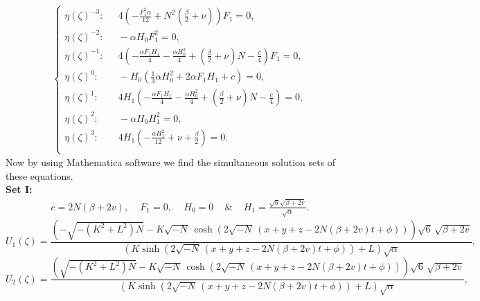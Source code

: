 \documentclass[10pt]{NSP1}
\numberwithin{equation}{section}
\begin{document}
\begin{align}
\begin{cases}
\eta{(\zeta)}^{-3} :\;\,\quad 4 \left(-\frac{F_{1}^{2} \alpha}{12}+N^{2} \left(\frac{\beta}{2}+\nu \right)\right) F_{1} = 0, \\
\eta{(\zeta)}^{-2} :\;\,\quad -\alpha  H_{0} F_{1}^{2} = 0,\\
\eta{(\zeta)}^{-1} :\,\;\quad 4 \left(-\frac{\alpha  F_{1} H_{1}}{4}-\frac{\alpha  H_{0}^{2}}{4}+\left(\frac{\beta}{2}+\nu \right) N -\frac{c}{4}\right) F_{1} = 0,\\
\eta{(\zeta)}^{0}  :\qquad -H_{0} \left(\frac{1}{3} \alpha  H_{0}^{2}+2 \alpha  F_{1} H_{1}+c \right) = 0,\\
\eta{(\zeta)}^{1}  :\qquad 4 H_{1} \left(-\frac{\alpha  F_{1} H_{1}}{4}-\frac{\alpha  H_{0}^{2}}{4}+\left(\frac{\beta}{2}+\nu \right) N -\frac{c}{4}\right) = 0,\\
\eta{(\zeta)}^{2}  :\qquad -\alpha  H_{0} H_{1}^{2} = 0, \\
\eta{(\zeta)}^{3}  :\qquad 4 H_{1} \left(-\frac{\alpha  H_{1}^{2}}{12}+\nu +\frac{\beta}{2}\right) = 0.\\
\end{cases}
\end{align}
Now by using Mathematica software we find the simultaneous solution sets of these equations.\\
\textbf{Set I:}
\begin{eqnarray}\label{set1}
c = 2N(\beta+2v),\quad\,F_{1} = 0,\quad\, H_{0} = 0\quad\,{\&}\quad\,H_{1} = \frac{\sqrt{6}\sqrt{\beta+2v}}{\sqrt{\alpha}}.
\end{eqnarray}
\begin{equation}\label{U1}
    U_{1}\! \left(\zeta \right) =
\frac{\left(-\sqrt{-\left(K^{2}+L^{2}\right) N}-K \sqrt{-N}\, \cosh \! \left(2 \sqrt{-N}\, \left(x + y + z  -2 N \left(\beta +2 v \right) t +\phi \right)\right)\right) \sqrt{6}\, \sqrt{\beta +2 v}}{\left(K \sinh \! \left(2 \sqrt{-N}\, \left(x + y + z -2 N \left(\beta +2 v \right) t +\phi \right)\right)+L \right) \sqrt{\alpha}},
\end{equation}
\begin{equation}\label{U2}
    U_{2}\! \left(\zeta \right) =
\frac{\left(\sqrt{-\left(K^{2}+L^{2}\right) N}-K \sqrt{-N}\, \cosh \! \left(2 \sqrt{-N}\, \left(x + y + z  -2 N \left(\beta +2 v \right) t +\phi \right)\right)\right) \sqrt{6}\, \sqrt{\beta +2 v}}{\left(K \sinh \! \left(2 \sqrt{-N}\, \left(x + y + z  -2 N \left(\beta +2 v \right) t +\phi \right)\right)+L \right) \sqrt{\alpha}},
\end{equation}
\end{document}
